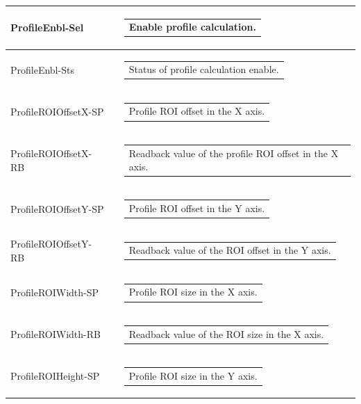 \documentclass[openany]{article}
\begin{document}
\begin{longtable}{| m{3.0cm} m{4.5cm} m{7.0cm} |}
        ProfileEnbl-Sel &  & \begin{tabular}{@{}m{6cm}@{}}
               Enable profile calculation.
            \end{tabular} \\ \hline
        ProfileEnbl-Sts &  & \begin{tabular}{@{}m{6cm}@{}}
                Status of profile calculation enable.
            \end{tabular} \hypertarget{}{}\\ \hline
        ProfileROIOffsetX-SP &  & \begin{tabular}{@{}m{6cm}@{}}
                Profile ROI offset in the X axis.
            \end{tabular} \\ \hline
        ProfileROIOffsetX-RB &  & \begin{tabular}{@{}m{6cm}@{}}
                Readback value of the profile ROI offset in the X axis.
            \end{tabular} \hypertarget{}{}\\ \hline
        ProfileROIOffsetY-SP &  & \begin{tabular}{@{}m{6cm}@{}}
                Profile ROI offset in the Y axis.
            \end{tabular} \\ \hline
        ProfileROIOffsetY-RB &  & \begin{tabular}{@{}m{6cm}@{}}
                Readback value of the ROI offset in the Y axis.
            \end{tabular} \hypertarget{}{}\\ \hline
        ProfileROIWidth-SP &  & \begin{tabular}{@{}m{6cm}@{}}
                Profile ROI size in the X axis.
            \end{tabular} \\ \hline
        ProfileROIWidth-RB &  & \begin{tabular}{@{}m{6cm}@{}}
                Readback value of the ROI size in the X axis.
            \end{tabular} \hypertarget{}{}\\ \hline
        ProfileROIHeight-SP &  & \begin{tabular}{@{}m{6cm}@{}}
                Profile ROI size in the Y axis.

\end{tabular}
\end{longtable}
\end{document}
